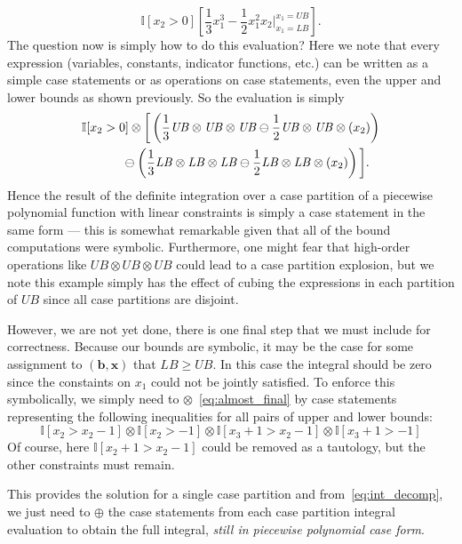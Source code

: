 \documentclass[letterpaper]{article}
\newcommand{\LB}{\mathit{LB}}
\newcommand{\UB}{\mathit{UB}}
\newcommand{\I}{\mathbb{I}}
\renewcommand{\vec}[1]{\mathbf{#1}}
\begin{document}
{{\footnotesize
\begin{equation}
\I[x_2 > 0] \left[ \frac{1}{3}x_1^3 - \frac{1}{2}x_1^2 x_2 \bigg|_{x_1=\LB}^{x_1=\UB} \right] .
\end{equation} }
The question now is simply how to do this evaluation?  Here we note
that every expression (variables, constants, indicator functions, etc.) 
can be written as a 
simple case statements or as operations on case statements, even the upper
and lower bounds as shown previously.  So the evaluation is simply 
\vspace{-1mm}
{\footnotesize
\begin{align}
\I[x_2 > 0] \otimes \bigg[ & \left( \frac{1}{3} \UB \otimes \UB \otimes \UB \ominus \frac{1}{2} \UB \otimes \UB \otimes (x_2) \right) \nonumber \\
& \hspace{-8mm} \ominus \left( \frac{1}{3} \LB \otimes \LB \otimes \LB \ominus \frac{1}{2} \LB \otimes \LB \otimes (x_2) \right) \bigg] \label{eq:almost_final}.
\end{align}
}
Hence the result of the definite integration over a case
partition of a piecewise polynomial function with linear constraints
is simply a case statement in the same form --- 
this is somewhat remarkable given that
all of the bound computations were symbolic.  Furthermore, one might
fear that high-order operations like $\UB \otimes \UB \otimes \UB$
could lead to a case partition explosion, but we note this example simply
has the effect of cubing the expressions in each partition of $\UB$ since
all case partitions are disjoint.

However, we are not yet done, there is one final step that we must
include for correctness.  Because our bounds are symbolic, it may be
the case for some assignment to $(\vec{b},\vec{x})$ that $\LB \geq
\UB$.  In this case the integral should be zero since the constaints
on $x_1$ could not be jointly satisfied.  To enforce this
symbolically, we simply need to $\otimes$~\eqref{eq:almost_final} by
case statements representing the following inequalities for all pairs
of upper and lower bounds:
{\footnotesize
\begin{equation}
\I[x_2 > x_2 - 1] \otimes \I[x_2 > -1] \otimes \I[x_3 + 1 > x_2 - 1] \otimes \I[x_3 + 1 > -1]
\end{equation}}
Of course, here $\I[x_2 + 1 > x_2 - 1]$ could be removed as a tautology,
but the other constraints must remain.

This provides the solution for a single case partition and 
from~\eqref{eq:int_decomp}, we just need to $\oplus$ the case
statements from each case partition integral evaluation to obtain
the full integral, \emph{still in piecewise polynomial case form}.

}
\end{document}
